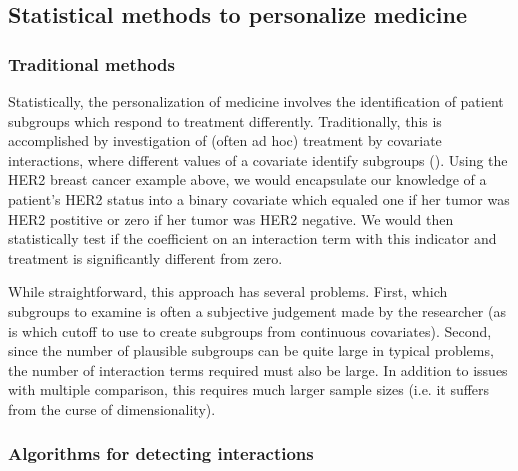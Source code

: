 \documentclass[12pt]{article}
\begin{document}

\subsection{Statistical methods to personalize medicine} %
\label{sub:statistical_methods_to_personalize_medicine}


\subsubsection{Traditional methods} %
\label{ssub:traditional_methods}


Statistically, the personalization of medicine involves the identification of patient subgroups which respond to treatment differently. Traditionally, this is accomplished by investigation of (often ad hoc) treatment by covariate interactions, where different values of a covariate identify subgroups (\cite{Byar1985}). Using the HER2 breast cancer example above, we would encapsulate our knowledge of a patient's HER2 status into a binary covariate which equaled one if her tumor was HER2 postitive or zero if her tumor was HER2 negative. We would then statistically test if the coefficient on an interaction term with this indicator and treatment is significantly different from zero.


While straightforward, this approach has several problems. First, which subgroups to examine is often a subjective judgement made by the researcher (as is which cutoff to use to create subgroups from continuous covariates). Second, since the number of plausible subgroups can be quite large in typical problems, the number of interaction terms required must also be large. In addition to issues with multiple comparison, this requires much larger sample sizes (i.e. it suffers from the curse of dimensionality).

\subsubsection{Algorithms for detecting interactions} %
\label{ssub:algorithms_for_detecting_interactions}
\end{document}

